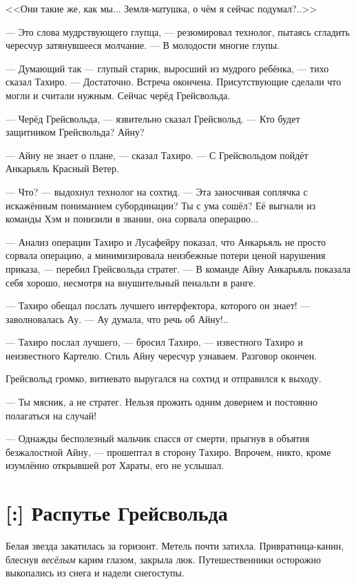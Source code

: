 <<Они такие же, как мы...
Земля-матушка, о чём я сейчас подумал?..>>

--- Это слова мудрствующего глупца, --- резюмировал технолог, пытаясь сгладить чересчур затянувшееся молчание.
--- В молодости многие глупы.

--- Думающий так --- глупый старик, выросший из мудрого ребёнка, --- тихо сказал Тахиро.
--- Достаточно.
Встреча окончена.
Присутствующие сделали что могли и считали нужным.
Сейчас черёд Грейсвольда.

--- Черёд Грейсвольда, --- язвительно сказал Грейсвольд.
--- Кто будет защитником Грейсвольда?
Айну?

--- Айну не знает о плане, --- сказал Тахиро.
--- С Грейсвольдом пойдёт Анкарьяль Красный Ветер.

--- Что? --- выдохнул технолог на сохтид.
--- Эта заносчивая соплячка с искажённым пониманием субординации?
Ты с ума сошёл?
Её выгнали из команды Хэм и понизили в звании, она сорвала операцию...

--- Анализ операции Тахиро и Лусафейру показал, что Анкарьяль не просто сорвала операцию, а минимизировала неизбежные потери ценой нарушения приказа, --- перебил Грейсвольда стратег.
--- В команде Айну Анкарьяль показала себя хорошо, несмотря на внушительный пенальти в ранге.

--- Тахиро обещал послать лучшего интерфектора, которого он знает! --- заволновалась Ау.
--- Ау думала, что речь об Айну!..

--- Тахиро послал лучшего, --- бросил Тахиро, --- известного Тахиро и неизвестного Картелю.
Стиль Айну чересчур узнаваем.
Разговор окончен.

Грейсвольд громко, витиевато выругался на сохтид и отправился к выходу.

--- Ты мясник, а не стратег.
Нельзя прожить одним доверием и постоянно полагаться на случай!

--- Однажды бесполезный мальчик спасся от смерти, прыгнув в объятия безжалостной Айну, --- прошептал в сторону Тахиро.
Впрочем, никто, кроме изумлённо открывшей рот Хараты, его не услышал.

\section{[:] Распутье Грейсвольда}

Белая звезда закатилась за горизонт.
Метель почти затихла.
Привратница-канин, блеснув \emph{весёлым} карим глазом, закрыла люк.
Путешественники осторожно выкопались из снега и надели снегоступы.

